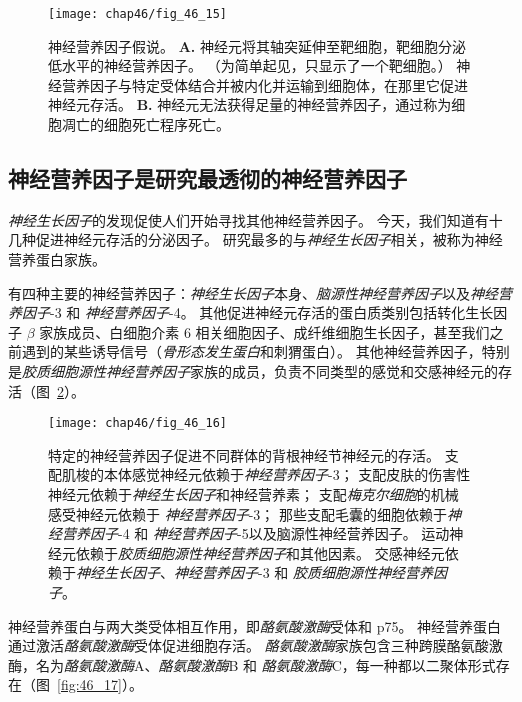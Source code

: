 \begin{figure}[htbp]
	\centering
	\texttt{[image: chap46/fig\_46\_15]}
	\caption{神经营养因子假说。
		\textbf{A.} 神经元将其轴突延伸至靶细胞，靶细胞分泌低水平的神经营养因子。
		（为简单起见，只显示了一个靶细胞。）
		神经营养因子与特定受体结合并被内化并运输到细胞体，在那里它促进神经元存活。
		\textbf{B.} 神经元无法获得足量的神经营养因子，通过称为细胞凋亡的细胞死亡程序死亡。}
	\label{fig:46_15}
\end{figure}



\subsection{神经营养因子是研究最透彻的神经营养因子}

\textit{神经生长因子}的发现促使人们开始寻找其他神经营养因子。
今天，我们知道有十几种促进神经元存活的分泌因子。
研究最多的与\textit{神经生长因子}相关，被称为神经营养蛋白家族。


有四种主要的神经营养因子：\textit{神经生长因子}本身、\textit{脑源性神经营养因子}以及\textit{神经营养因子}-3 和 \textit{神经营养因子}-4。
其他促进神经元存活的蛋白质类别包括转化生长因子 $ \beta $ 家族成员、白细胞介素 6 相关细胞因子、成纤维细胞生长因子，甚至我们之前遇到的某些诱导信号（\textit{骨形态发生蛋白}和刺猬蛋白）。
其他神经营养因子，特别是\textit{胶质细胞源性神经营养因子}家族的成员，负责不同类型的感觉和交感神经元的存活（图~\ref{fig:46_16}）。


\begin{figure}[htbp]
	\centering
	\texttt{[image: chap46/fig\_46\_16]}
	\caption{特定的神经营养因子促进不同群体的背根神经节神经元的存活。
		支配肌梭的本体感觉神经元依赖于\textit{神经营养因子}-3；
		支配皮肤的伤害性神经元依赖于\textit{神经生长因子}和神经营养素；
		支配\textit{梅克尔细胞}的机械感受神经元依赖于 \textit{神经营养因子}-3；
		那些支配毛囊的细胞依赖于\textit{神经营养因子}-4 和 \textit{神经营养因子}-5以及脑源性神经营养因子。
		运动神经元依赖于\textit{胶质细胞源性神经营养因子}和其他因素。
		交感神经元依赖于\textit{神经生长因子}、\textit{神经营养因子}-3 和 \textit{胶质细胞源性神经营养因子}\cite{reichardt1997neurotrophic}。}
	\label{fig:46_16}
\end{figure}


神经营养蛋白与两大类受体相互作用，即\textit{酪氨酸激酶}受体和 p75。
神经营养蛋白通过激活\textit{酪氨酸激酶}受体促进细胞存活。
\textit{酪氨酸激酶}家族包含三种跨膜酪氨酸激酶，名为\textit{酪氨酸激酶}A、\textit{酪氨酸激酶}B 和 \textit{酪氨酸激酶}C，每一种都以二聚体形式存在（图~\ref{fig:46_17}）。


